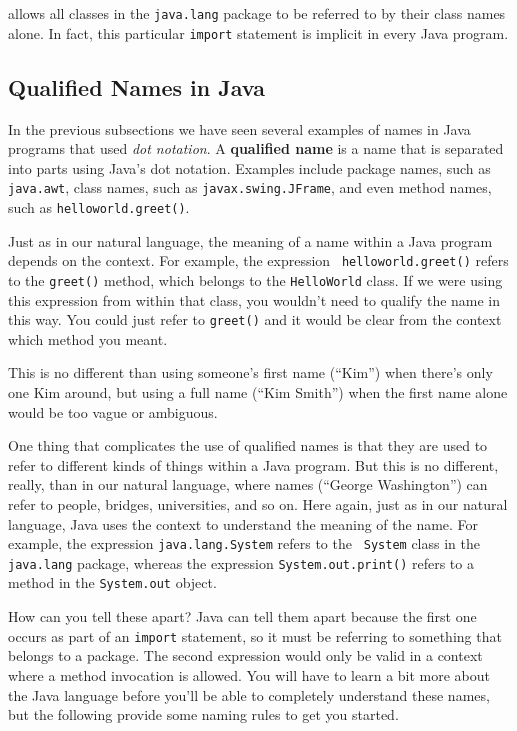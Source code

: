 \noindent allows all classes in the {\tt java.lang} package to
be referred to by their class names alone. In fact, this particular
{\tt import} statement is implicit in every Java program.
\subsection{Qualified Names in Java}
\label{subsec:qualifiednames}

\noindent In the previous subsections we have seen several
examples of names in Java programs that used {\it dot notation}.  A
{\bf qualified name} is a name that is separated into parts using
Java's dot notation. Examples include package names, such as {\tt
java.awt}, class names, such as {\tt javax.swing.JFrame}, and
even method names, such as {\tt helloworld.greet()}.

Just as in our natural language, the meaning of a name within a Java
program depends on the context.  For example, the expression {\tt
helloworld.greet()} refers to the {\tt greet()} method, which
belongs to the {\tt HelloWorld} class.  If we were using this
expression from within that class, you wouldn't need to qualify
the name in this way.  You could just refer to {\tt greet()} and it
would be clear from the context which method you meant.

This is no different than using someone's first name (``Kim'') when
there's only one Kim around, but using a full name (``Kim Smith'')
when the first name alone would be too vague or ambiguous.

One thing that complicates the use of qualified names is that they are
used to refer to different kinds of things within a Java program.  But
this is no different, really, than in our natural language, where
names (``George Washington'') can refer to people, bridges,
universities, and so on. Here again, just as in our natural language,
Java uses the context to understand the meaning of the name.  For
example, the expression {\tt java.lang.System} refers to the {\tt
System} class in the {\tt java.lang} package, whereas the expression
{\tt System.out.print()} refers to a method in the {\tt System.out}
object.

How can you tell these apart?  Java can tell them apart because the
first one occurs as part of an {\tt import} statement, so it must be
referring to something that belongs to a package.  The second expression
would only be valid in a context where a method invocation is allowed.
You will have to learn a bit more about the Java language before
you'll be able to completely understand these names, but the following
provide some naming rules to get you started.

